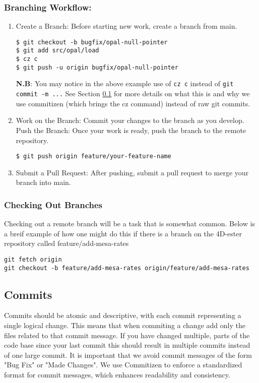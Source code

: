 \documentclass{ol-softwaremanual}
\begin{document}
\subsubsection{Branching Workflow:}
\begin{enumerate}
\item Create a Branch: Before starting new work, create a branch from main.
\begin{terminal}
\begin{verbatim}
$ git checkout -b bugfix/opal-null-pointer
$ git add src/opal/load
$ cz c
$ git push -u origin bugfix/opal-null-pointer
\end{verbatim}
\vspace{1mm}
\vspace{1mm}
  {\color{green} \textbf{N.B}: You may notice in the above example use of \Verb#cz c# instead of \Verb#git commit -m ...# See Section \ref{sec:commits} for more details on what this is and why we use commitizen (which brings the cz command) instead of raw git commits.}
\end{terminal}
\item Work on the Branch: Commit your changes to the branch as you develop.
Push the Branch: Once your work is ready, push the branch to the remote repository.
\begin{terminal}
\begin{verbatim}
$ git push origin feature/your-feature-name
\end{verbatim}
\end{terminal}
\item Submit a Pull Request: After pushing, submit a pull request to merge your branch into main.
\end{enumerate}
\subsubsection{Checking Out Branches}
Checking out a remote branch will be a task that is somewhat common. Below is a breif example of how one might do this if there is a branch on the 4D-ester repository called feature/add-mesa-rates
\begin{terminal}
\begin{verbatim}
git fetch origin
git checkout -b feature/add-mesa-rates origin/feature/add-mesa-rates
\end{verbatim}
\end{terminal}
\subsection{Commits}\label{sec:commits}
Commits should be atomic and descriptive, with each commit representing a single logical change. This means that when commiting a change add only the files related to that commit message. If you have changed multiple, parts of the code base since your last commit this should result in multiple commits instead of one large commit. It is important that we avoid commit messages of the form "Bug Fix" or "Made Changes". We use Commitizen to enforce a standardized format for commit messages, which enhances readability and consistency.
\end{document}
